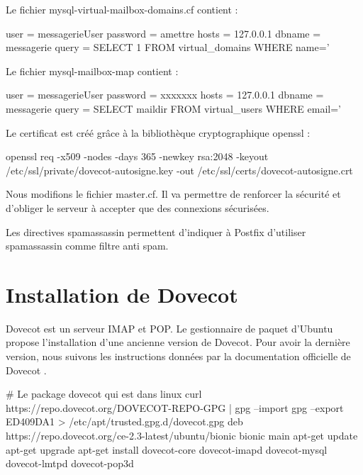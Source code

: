 \documentclass[a4paper,12pt,french]{report} %
\begin{document}
Le fichier mysql-virtual-mailbox-domains.cf contient :
\begin{exempleConsole}
user = messagerieUser
password = amettre
hosts = 127.0.0.1
dbname = messagerie
query = SELECT 1 FROM virtual_domains WHERE name='%
\end{exempleConsole}

Le fichier mysql-mailbox-map contient :
\begin{exempleConsole}
user = messagerieUser
password = xxxxxxx
hosts = 127.0.0.1
dbname = messagerie
query = SELECT maildir FROM virtual_users WHERE email='%
\end{exempleConsole}

Le certificat est créé grâce à la bibliothèque cryptographique openssl :
\begin{exempleConsole}
openssl req -x509 -nodes -days 365 -newkey rsa:2048 -keyout /etc/ssl/private/dovecot-autosigne.key -out /etc/ssl/certs/dovecot-autosigne.crt
\end{exempleConsole}

Nous modifions le fichier master.cf. Il va permettre de renforcer la sécurité et d'obliger le serveur à accepter que des connexions sécurisées.
\cesure
{}

Les directives spamassassin permettent d'indiquer à Postfix d'utiliser spamassassin comme filtre anti spam.

\section{Installation de Dovecot}
Dovecot est un serveur IMAP et POP.
Le gestionnaire de paquet d'Ubuntu propose l'installation d'une ancienne version de Dovecot. Pour avoir la dernière version, nous suivons les instructions données par la documentation officielle de Dovecot \cite{ref1}.
\begin{exempleConsole}
# Le package dovecot qui est dans linux 
curl https://repo.dovecot.org/DOVECOT-REPO-GPG | gpg --import
gpg --export ED409DA1 > /etc/apt/trusted.gpg.d/dovecot.gpg
deb https://repo.dovecot.org/ce-2.3-latest/ubuntu/bionic bionic main
apt-get update 
apt-get upgrade
apt-get install dovecot-core dovecot-imapd dovecot-mysql dovecot-lmtpd dovecot-pop3d
\end{exempleConsole}
\end{document}
